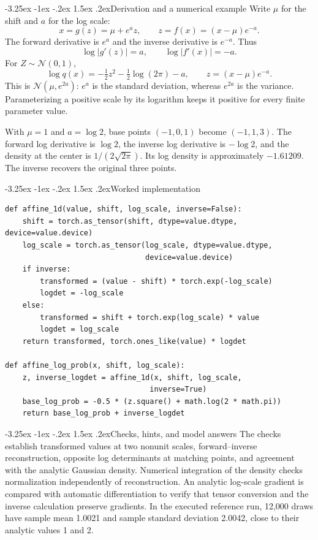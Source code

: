 \documentclass[11pt,a4paper]{article}
\makeatletter
\newcommand{\Normal}{\mathcal N}
\renewcommand\subsection{\@startsection{subsection}{2}{\z@}%
  {-3.25ex \@plus -1ex \@minus -.2ex}%
  {1.5ex \@plus .2ex}{\normalfont\large}}
\makeatother
\begin{document}
\subsection{Derivation and a numerical example}
Write $\mu$ for the shift and $a$ for the log scale:
\[
 x=g(z)=\mu+e^a z,\qquad
 z=f(x)=(x-\mu)e^{-a}.
\]
The forward derivative is $e^a$ and the inverse derivative is $e^{-a}$. Thus
\[
 \log|g'(z)|=a,\qquad \log|f'(x)|=-a.
\]
For $Z\sim\Normal(0,1)$,
\[
 \log q(x)=-\tfrac12z^2-\tfrac12\log(2\pi)-a,
 \qquad z=(x-\mu)e^{-a}.
\]
This is $\Normal(\mu,e^{2a})$: $e^a$ is the standard deviation, whereas
$e^{2a}$ is the variance. Parameterizing a positive scale by its logarithm
keeps it positive for every finite parameter value.

With $\mu=1$ and $a=\log2$, base points $(-1,0,1)$ become $(-1,1,3)$.
The forward log derivative is $\log2$, the inverse log derivative is
$-\log2$, and the density at the center is $1/(2\sqrt{2\pi})$. Its log density
is approximately $-1.61209$. The inverse recovers the original three points.

\subsection{Worked implementation}
\begin{lstlisting}
def affine_1d(value, shift, log_scale, inverse=False):
    shift = torch.as_tensor(shift, dtype=value.dtype, device=value.device)
    log_scale = torch.as_tensor(log_scale, dtype=value.dtype,
                                device=value.device)
    if inverse:
        transformed = (value - shift) * torch.exp(-log_scale)
        logdet = -log_scale
    else:
        transformed = shift + torch.exp(log_scale) * value
        logdet = log_scale
    return transformed, torch.ones_like(value) * logdet

def affine_log_prob(x, shift, log_scale):
    z, inverse_logdet = affine_1d(x, shift, log_scale,
                                 inverse=True)
    base_log_prob = -0.5 * (z.square() + math.log(2 * math.pi))
    return base_log_prob + inverse_logdet
\end{lstlisting}

\subsection{Checks, hints, and model answers}
The checks establish transformed values at two nonunit scales,
forward--inverse reconstruction, opposite log determinants at matching points,
and agreement with the analytic Gaussian density. Numerical integration of
the density checks normalization independently of reconstruction. An analytic
log-scale gradient is compared with automatic differentiation to verify that
tensor conversion and the inverse calculation preserve gradients. In the
executed reference run, 12,000 draws have sample mean 1.0021 and sample standard
deviation 2.0042, close to their analytic values 1 and 2.
\end{document}

